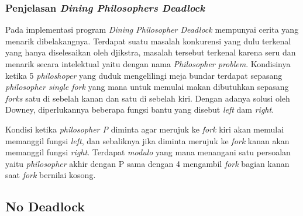\documentclass[11pt,a4paper]{article}
\begin{document}
\subsubsection{Penjelasan \textit{Dining Philosophers Deadlock}}
Pada implementasi program \textit{Dining Philosopher Deadlock} mempunyai cerita yang menarik dibelakangnya. Terdapat suatu masalah konkurensi yang dulu terkenal yang hanya diselesaikan 
oleh djikstra, masalah tersebut terkenal karena seru dan menarik secara intelektual yaitu dengan nama \textit{Philosopher problem}. Kondisinya ketika 5 \textit{philoshoper} yang duduk mengelilingi 
meja bundar terdapat sepasang \textit{philosopher single fork} yang mana untuk memulai makan dibutuhkan sepasang \textit{forks} satu di sebelah kanan dan satu di sebelah kiri. Dengan adanya solusi oleh 
Downey, diperlukannya beberapa fungsi bantu yang disebut \textit{left} dam \textit{right}. \par
Kondisi ketika \textit{philosopher P} diminta agar merujuk ke \textit{fork} kiri akan memulai memanggil fungsi \textit{left}, dan sebaliknya jika diminta merujuk ke \textit{fork} kanan akan memanggil fungsi 
\textit{right}. Terdapat \textit{modulo} yang mana menangani satu persoalan yaitu \textit{philosopher} akhir dengan P sama dengan 4 mengambil \textit{fork} bagian kanan saat \textit{fork} bernilai kosong.

\subsection{No Deadlock}
\end{document}
